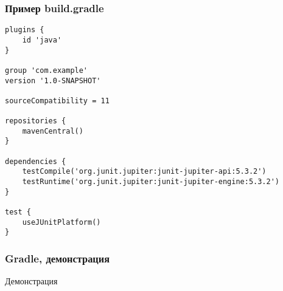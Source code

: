 \documentclass[xetex,mathserif,serif]{beamer}
\begin{document}
	\begin{frame}[fragile]
		\frametitle{Пример build.gradle}
		\begin{scriptsize}
			\begin{verbatim}
plugins {
    id 'java'
}

group 'com.example'
version '1.0-SNAPSHOT'

sourceCompatibility = 11

repositories {
    mavenCentral()
}

dependencies {
    testCompile('org.junit.jupiter:junit-jupiter-api:5.3.2')
    testRuntime('org.junit.jupiter:junit-jupiter-engine:5.3.2')
}

test {
    useJUnitPlatform()
}
			\end{verbatim}
		\end{scriptsize}
	\end{frame}

	\begin{frame}
		\frametitle{Gradle, демонстрация}
		\begin{center}
			\huge{Демонстрация}
		\end{center}
	\end{frame}
\end{document}

